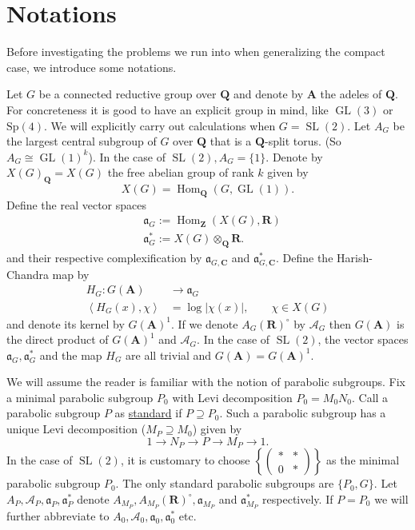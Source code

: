 \documentclass[11pt]{amsart}
\def\A{\mathbf A}
\def\C{\mathbf C}
\def\Q{\mathbf Q}
\def\R{\mathbf R}
\def\Z{\mathbf Z}
\def\AAA{\mathcal A}	%
\def\aaa{\mathfrak a}
\def\cb#1{{\color{black}#1}}
\def\gl{\operatorname{GL}}
\def\hom{\operatorname{Hom}}
\def\mod#1{\lvert #1 \rvert} %
\def\sl{\operatorname{SL}}
\def\sprod#1#2{\left\langle #1 , #2 \right\rangle}  %
\theoremstyle{remark}
\begin{document}
\section{Notations} \label{sec_not1}

Before investigating the problems we run into when generalizing the compact case, we introduce some notations. 

Let $G$ be a connected reductive group over $\Q$ and denote by $\A$ the adeles of $\Q$. For concreteness it is good to have an explicit group in mind, like $\gl(3)$ or $\text{Sp}(4)$. \cb{We will explicitly carry out calculations when $G = \sl(2)$.} Let $A_G$ be the largest central subgroup of $G$ over $\Q$ that is a $\Q$-split torus. (So $A_G \cong \gl(1)^k$). \cb{In the case of $\sl(2), A_G = \{1\}$.} Denote by $X(G)_\Q = X(G)$ the free abelian group of rank $k$ given by
\[ X(G) = \hom_\Q(G, \gl(1)). \]
Define the real vector spaces
\begin{align*}
	& \aaa_G := \hom_\Z(X(G), \R) \\
	& \aaa_G^* := X(G) \otimes_\Q \R.
\end{align*}
and their respective complexification by $\aaa_{G, \C}$ and $\aaa_{G, \C}^*$. 
Define the Harish-Chandra map by
\begin{align*}
	H_G : G(\A) & \to \aaa_G \\
	\sprod{H_G(x)}{\chi} & = \log \mod{\chi(x)}, \qquad \chi \in X(G)
\end{align*}
and denote its kernel by $G(\A)^1$. If we denote $A_G(\R)^\circ$ by $\AAA_G$ then $G(\A)$ is the direct product of $G(\A)^1$ and $\AAA_G$. \cb{In the case of $\sl(2)$, the vector spaces $\aaa_G, \aaa_G^*$ and the map $H_G$ are all trivial and $G(\A) = G(\A)^1$.}

We will assume the reader is familiar with the notion of parabolic subgroups. Fix a minimal parabolic subgroup $P_0$ with Levi decomposition $P_0 = M_0 N_0$. Call a parabolic subgroup $P$ as \underline{standard} if $P \supseteq P_0$.  Such a parabolic subgroup has a unique Levi decomposition ($M_P \supseteq M_0$) given by
\[ 1 \to N_P \to P \to M_P \to 1. \]
\cb{ In the case of $\sl(2)$, it is customary to choose $\left\{\begin{pmatrix} * & * \\ 0 & * \end{pmatrix}\right\}$ as the minimal parabolic subgroup $P_0$. The only standard parabolic subgroups are $\{P_0, G\}$. }
Let $A_P, \AAA_P, \aaa_P, \aaa_P^*$ denote $A_{M_P}, A_{M_P}(\R)^\circ, \aaa_{M_P}$ and $\aaa_{M_P}^*$ respectively. If $P = P_0$ we will further abbreviate to $A_0, \AAA_0, \aaa_0, \aaa_0^*$ etc. 
\end{document}
